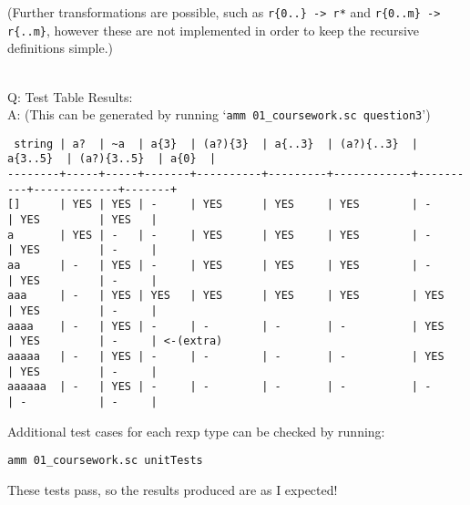 \documentclass[english]{scrartcl}
\begin{document}
(Further transformations are possible, such as \verb~r{0..} -> r*~ and \verb~r{0..m} -> r{..m}~, however these are not implemented in order to keep the recursive definitions simple.)

\mbox{}\\

Q: Test Table Results: \\
A: (This can be generated by running `\verb|amm 01_coursework.sc question3|')
\footnotesize\begin{verbatim}
 string | a?  | ~a  | a{3}  | (a?){3}  | a{..3}  | (a?){..3}  | a{3..5}  | (a?){3..5}  | a{0}  |
--------+-----+-----+-------+----------+---------+------------+----------+-------------+-------+
[]      | YES | YES | -     | YES      | YES     | YES        | -        | YES         | YES   |
a       | YES | -   | -     | YES      | YES     | YES        | -        | YES         | -     |
aa      | -   | YES | -     | YES      | YES     | YES        | -        | YES         | -     |
aaa     | -   | YES | YES   | YES      | YES     | YES        | YES      | YES         | -     |
aaaa    | -   | YES | -     | -        | -       | -          | YES      | YES         | -     | <-(extra)
aaaaa   | -   | YES | -     | -        | -       | -          | YES      | YES         | -     |
aaaaaa  | -   | YES | -     | -        | -       | -          | -        | -           | -     |
\end{verbatim}
\normalsize

Additional test cases for each rexp type can be checked by running:
\begin{center}
    \verb|amm 01_coursework.sc unitTests|
\end{center}

These tests pass, so the results produced are as I expected!

\end{document}
